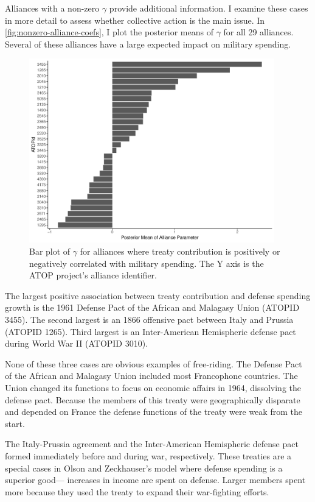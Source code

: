 \documentclass[12pt]{article}
\begin{document}
Alliances with a non-zero $\gamma$ provide additional information. 
I examine these cases in more detail to assess whether collective action is the main issue. 
In \autoref{fig:nonzero-alliance-coefs}, I plot the posterior means of $\gamma$ for all 29 alliances.  
Several of these alliances have a large expected impact on military spending. 


\begin{figure}
	\centering
		\includegraphics[width=0.95\textwidth]{nonzero-alliance-coefs.pdf}
	\caption{Bar plot of $\gamma$ for alliances where treaty contribution is positively or negatively correlated with military spending. The Y axis is the ATOP project's alliance identifier.}	
	\label{fig:nonzero-alliance-coefs}
\end{figure}


The largest positive association between treaty contribution and defense spending growth is the 1961 Defense Pact of the African and Malagasy Union (ATOPID 3455). 
The second largest is an 1866 offensive pact between Italy and Prussia (ATOPID 1265). 
Third largest is an Inter-American Hemispheric defense pact during World War II (ATOPID 3010). 


None of these three cases are obvious examples of free-riding. 
The Defense Pact of the African and Malagasy Union included most Francophone countries. 
The Union changed its functions to focus on economic affairs in 1964, dissolving the defense pact. 
Because the members of this treaty were geographically disparate and depended on France the defense functions of the treaty were weak from the start. 


The Italy-Prussia agreement and the Inter-American Hemispheric defense pact formed immediately before and during war, respectively. 
These treaties are a special cases in Olson and Zeckhauser's model where defense spending is a superior good--- increases in income are spent on defense. 
Larger members spent more because they used the treaty to expand their war-fighting efforts. 
\end{document}
